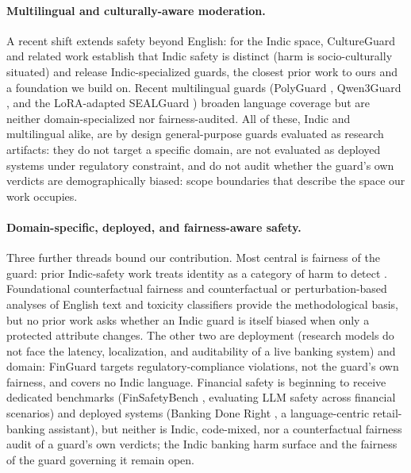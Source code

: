 \documentclass[11pt]{article}
\begin{document}
\paragraph{Multilingual and culturally-aware moderation.} A recent shift extends safety beyond English: for the Indic space, CultureGuard \citep{joshi2025cultureguard} and related work establish that Indic safety is distinct (harm is socio-culturally situated) and release Indic-specialized guards, the closest prior work to ours and a foundation we build on. Recent multilingual guards (PolyGuard \citep{kumar2025polyguard}, Qwen3Guard \citep{qwen3guard2025}, and the LoRA-adapted SEALGuard \citep{sealguard2025}) broaden language coverage but are neither domain-specialized nor fairness-audited. All of these, Indic and multilingual alike, are by design general-purpose guards evaluated as research artifacts: they do not target a specific domain, are not evaluated as deployed systems under regulatory constraint, and do not audit whether the guard's own verdicts are demographically biased: scope boundaries that describe the space our work occupies.

\paragraph{Domain-specific, deployed, and fairness-aware safety.} Three further threads bound our contribution. Most central is fairness of the guard: prior Indic-safety work treats identity as a category of harm to detect \citep{sahoo2024indibias,nawale2025fairitales,khandelwal2024indianbhed}. Foundational counterfactual fairness \citep{kusner2017} and counterfactual or perturbation-based analyses of English text and toxicity classifiers \citep{dixon2018,prabhakaran2019,garg2019} provide the methodological basis, but no prior work asks whether an Indic guard is itself biased when only a protected attribute changes. The other two are deployment (research models do not face the latency, localization, and auditability of a live banking system) and domain: FinGuard \citep{dou2026finguard} targets regulatory-compliance violations, not the guard's own fairness, and covers no Indic language. Financial safety is beginning to receive dedicated benchmarks (FinSafetyBench \citep{hou2026finsafetybench}, evaluating LLM safety across financial scenarios) and deployed systems (Banking Done Right \citep{chua2025banking}, a language-centric retail-banking assistant), but neither is Indic, code-mixed, nor a counterfactual fairness audit of a guard's own verdicts; the Indic banking harm surface and the fairness of the guard governing it remain open.
\end{document}
